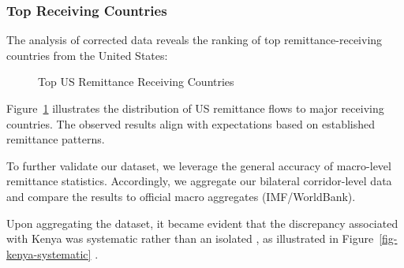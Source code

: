 \documentclass[
  11pt,
]{article}
\begin{document}
\subsubsection{Top Receiving Countries}\label{top-receiving-countries}

The analysis of corrected data reveals the ranking of top
remittance-receiving countries from the United States:

\begin{figure}[H]


\caption{\label{fig-top-receiving-countries}Top US Remittance Receiving
Countries}

\end{figure}%

Figure~\ref{fig-top-receiving-countries} illustrates the distribution of
US remittance flows to major receiving countries. The observed results
align with expectations based on established remittance patterns.

To further validate our dataset, we leverage the general accuracy of
macro-level remittance statistics. Accordingly, we aggregate our
bilateral corridor-level data and compare the results to official macro
aggregates (IMF/WorldBank).

Upon aggregating the dataset, it became evident that the discrepancy
associated with Kenya was systematic rather than an isolated , as
illustrated in Figure~\ref{fig-kenya-systematic} .
\end{document}

